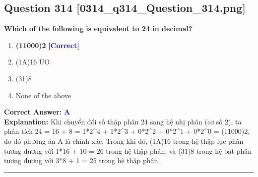 \documentclass[11pt,a4paper]{article}
\begin{document}
\begin{minipage}{\textwidth}
\subsection*{Question 314 \quad \footnotesize{[0314\_q314\_Question\_314.png]}}
\noindent \textbf{Which of the following is equivalent to 24 in decimal?}

\begin{enumerate}[label=\Alph*.]
    \item \textbf{(11000)2} \hfill \textcolor{blue}{\textbf{[Correct]}}
    \item (1A)16 UO
    \item (31)8
    \item None of the above
\end{enumerate}

\noindent \textbf{Correct Answer:} \textcolor{blue}{\textbf{A}} \\[2pt]
\noindent \textbf{Explanation:} Khi chuyển đổi số thập phân 24 sang hệ nhị phân (cơ số 2), ta phân tích 24 = 16 + 8 = 1*2\textasciicircum{}4 + 1*2\textasciicircum{}3 + 0*2\textasciicircum{}2 + 0*2\textasciicircum{}1 + 0*2\textasciicircum{}0 = (11000)2, do đó phương án A là chính xác. Trong khi đó, (1A)16 trong hệ thập lục phân tương đương với 1*16 + 10 = 26 trong hệ thập phân, và (31)8 trong hệ bát phân tương đương với 3*8 + 1 = 25 trong hệ thập phân.

\par\vspace{0.3cm}
\hrule
\vspace{0.3cm}
\end{minipage}
\end{document}
